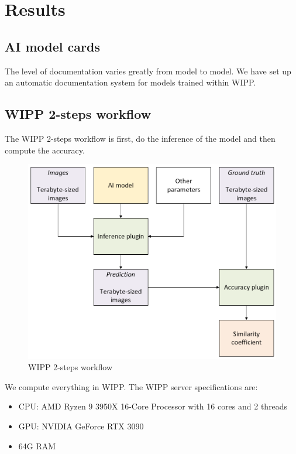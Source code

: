 \section{Results}
\label{sec:results}

\subsection{AI model cards}

The level of documentation varies greatly from model to model. We have set up an
automatic documentation system for models trained within \Gls{WIPP}.

\subsection{WIPP 2-steps workflow}

The WIPP 2-steps workflow is first, do the inference of the model and then
compute the accuracy.

\begin{figure}[H]
  \centering
  \includegraphics[width=1.0\linewidth]{png/workflow.png}
  \caption{WIPP 2-steps workflow}
  \label{fig:workflow}
\end{figure}

We compute everything in \Gls{WIPP}. The \Gls{WIPP} server specifications are:
\begin{itemize}
  \item CPU: AMD Ryzen 9 3950X 16-Core Processor with 16 cores and 2 threads
  \item GPU: NVIDIA GeForce RTX 3090
  \item 64G RAM
\end{itemize}

